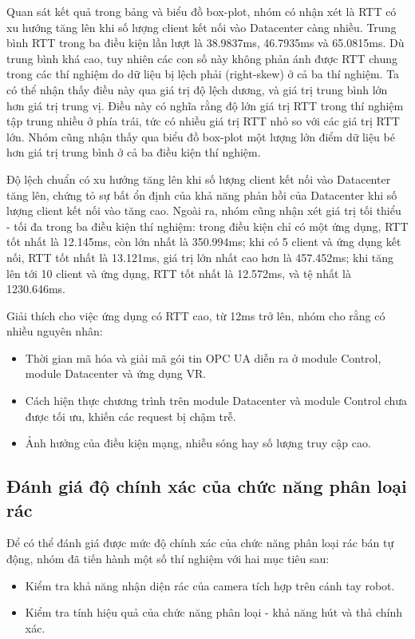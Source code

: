 Quan sát kết quả trong bảng và biểu đồ box-plot, nhóm có nhận xét là RTT có xu hướng tăng lên khi số lượng client kết nối vào Datacenter càng nhiều. Trung bình RTT trong ba điều kiện lần lượt là 38.9837ms, 46.7935ms và 65.0815ms. Dù trung bình khá cao, tuy nhiên các con số này không phản ánh được RTT chung trong các thí nghiệm do dữ liệu bị lệch phải (right-skew) ở cả ba thí nghiệm. Ta có thể nhận thấy điều này qua giá trị độ lệch dương, và giá trị trung bình lớn hơn giá trị trung vị. Điều này có nghĩa rằng độ lớn giá trị RTT trong thí nghiệm tập trung nhiều ở phía trái, tức có nhiều giá trị RTT nhỏ so với các giá trị RTT lớn. Nhóm cũng nhận thấy qua biểu đồ box-plot một lượng lớn điểm dữ liệu bé hơn giá trị trung bình ở cả ba điều kiện thí nghiệm.

Độ lệch chuẩn có xu hướng tăng lên khi số lượng client kết nối vào Datacenter tăng lên, chứng tỏ sự bất ổn định của khả năng phản hồi của Datacenter khi số lượng client kết nối vào tăng cao. Ngoài ra, nhóm cũng nhận xét giá trị tối thiểu - tối đa trong ba điều kiện thí nghiệm: trong điều kiện chỉ có một ứng dụng, RTT tốt nhất là 12.145ms, còn lớn nhất là 350.994ms; khi có 5 client và ứng dụng kết nối, RTT tốt nhất là 13.121ms, giá trị lớn nhất cao hơn là 457.452ms; khi tăng lên tới 10 client và ứng dụng, RTT tốt nhất là 12.572ms, và tệ nhất là 1230.646ms. 

Giải thích cho việc ứng dụng có RTT cao, từ 12ms trở lên, nhóm cho rằng có nhiều nguyên nhân: 

\begin{itemize}
    \item Thời gian mã hóa và giải mã gói tin OPC UA diễn ra ở module Control, module Datacenter và ứng dụng VR.
    \item Cách hiện thực chương trình trên module Datacenter và module Control chưa được tối ưu, khiến các request bị chậm trễ.
    \item Ảnh hưởng của điều kiện mạng, nhiễu sóng hay số lượng truy cập cao.
\end{itemize}




\subsection{Đánh giá độ chính xác của chức năng phân loại rác}

Để có thể đánh giá được mức độ chính xác của chức năng phân loại rác bán tự động, nhóm đã tiến hành một số thí nghiệm với hai mục tiêu sau:
\begin{itemize}
    \item Kiểm tra khả năng nhận diện rác của camera tích hợp trên cánh tay robot.
    \item Kiểm tra tính hiệu quả của chức năng phân loại - khả năng hút và thả chính xác.
\end{itemize}


